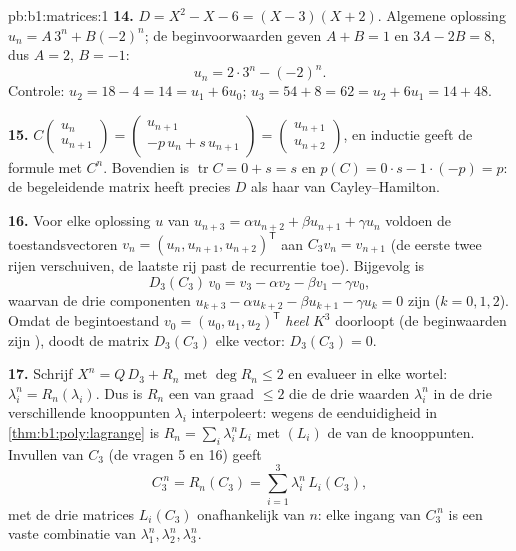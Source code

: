 \begin{solution}{pb:b1:matrices:1}
\textbf{14.} $D = X^2 - X - 6 = (X - 3)(X + 2)$. Algemene
oplossing $u_n = A\,3^n + B(-2)^n$; de beginvoorwaarden geven $A +
B = 1$ en $3A - 2B = 8$, dus $A = 2$, $B = -1$:
\[
u_n = 2\cdot 3^n - (-2)^n .
\]
Controle: $u_2 = 18 - 4 = 14 = u_1 + 6u_0$; $u_3 = 54 + 8 = 62 =
u_2 + 6u_1 = 14 + 48$.

\textbf{15.} $C\begin{pmatrix} u_n\\ u_{n+1}\end{pmatrix} =
\begin{pmatrix} u_{n+1}\\ -p\,u_n + s\,u_{n+1}\end{pmatrix} =
\begin{pmatrix} u_{n+1}\\ u_{n+2}\end{pmatrix}$, en inductie geeft
de formule met $C^n$. Bovendien is $\operatorname{tr} C = 0 + s =
s$ en $p(C) = 0\cdot s - 1\cdot(-p) = p$: de begeleidende matrix
heeft precies $D$ als haar  van Cayley--Hamilton.

\textbf{16.} Voor elke oplossing $u$ van $u_{n+3} = \alpha u_{n+2}
+ \beta u_{n+1} + \gamma u_n$ voldoen de toestandsvectoren $v_n =
(u_n, u_{n+1}, u_{n+2})^{\mathsf T}$ aan $C_3 v_n = v_{n+1}$ (de
eerste twee rijen verschuiven, de laatste rij past de recurrentie
toe). Bijgevolg is
\[
D_3(C_3)\,v_0 = v_3 - \alpha v_2 - \beta v_1 - \gamma v_0 ,
\]
waarvan de drie componenten $u_{k+3} - \alpha u_{k+2} - \beta
u_{k+1} - \gamma u_k = 0$ zijn ($k = 0, 1, 2$). Omdat de
begintoestand $v_0 = (u_0, u_1, u_2)^{\mathsf T}$ \emph{heel} $K^3$
doorloopt (de beginwaarden zijn ), doodt de matrix $D_3(C_3)$
elke vector: $D_3(C_3) = 0$.

\textbf{17.} Schrijf $X^n = Q\,D_3 + R_n$ met $\deg R_n \leq 2$ en
evalueer in elke wortel: $\lambda_i^n = R_n(\lambda_i)$. Dus is
$R_n$ een  van graad $\leq 2$ die de drie waarden
$\lambda_i^n$ in de drie verschillende knooppunten $\lambda_i$
interpoleert: wegens de eenduidigheid in
\cref{thm:b1:poly:lagrange} is $R_n = \sum_i \lambda_i^n L_i$ met
$(L_i)$ de  van de knooppunten. Invullen van $C_3$
(de vragen 5 en 16) geeft
\[
C_3^{\,n} = R_n(C_3) = \sum_{i=1}^{3} \lambda_i^n\,L_i(C_3),
\]
met de drie matrices $L_i(C_3)$ onafhankelijk van $n$: elke ingang
van $C_3^{\,n}$ is een vaste combinatie van $\lambda_1^n,
\lambda_2^n, \lambda_3^n$.


\end{solution}
